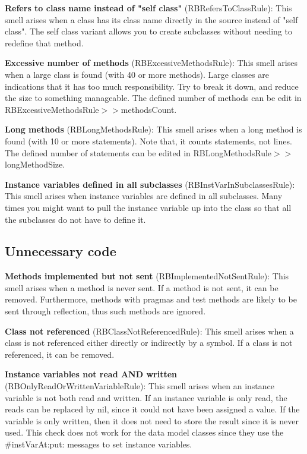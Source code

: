 \textbf{Refers to class name instead of "self class"} (RBRefersToClassRule): This smell arises when a class has its class name directly in the source instead of "self class". The self class variant allows you to create subclasses without needing to redefine that method.

\textbf{Excessive number of methods} (RBExcessiveMethodsRule): This smell arises when a large class is found (with 40 or more methods). Large classes are indications that it has too much responsibility. Try to break it down, and reduce the size to something manageable. The defined number of methods can be edit in RBExcessiveMethodsRule$>>$methodsCount.

\textbf{Long methods} (RBLongMethodsRule): This smell arises when a long method is found (with 10 or more statements). Note that, it counts statements, not lines. The defined number of statements can be edited in RBLongMethodsRule$>>$longMethodSize.

\textbf{Instance variables defined in all subclasses} (RBInstVarInSubclassesRule): This smell arises when instance variables are defined in all subclasses. Many times you might want to pull the instance variable up into the class so that all the subclasses do not have to define it.

\subsection{Unnecessary code}
\textbf{Methods implemented but not sent} (RBImplementedNotSentRule): This smell arises when a method is never sent. If a method is not sent, it can be removed. Furthermore, methods with pragmas and test methods are likely to be sent through reflection, thus such methods are ignored.

\textbf{Class not referenced} (RBClassNotReferencedRule): This smell arises when a class is not referenced either directly or indirectly by a symbol. If a class is not referenced, it can be removed.

\textbf{Instance variables not read AND written} (RBOnlyReadOrWrittenVariableRule): This smell arises when an instance variable is not both read and written. If an instance variable is only read, the reads can be replaced by nil, since it could not have been assigned a value. If the variable is only written, then it does not need to store the result since it is never used. This check does not work for the data model classes since they use the \#instVarAt:put: messages to set instance variables.

